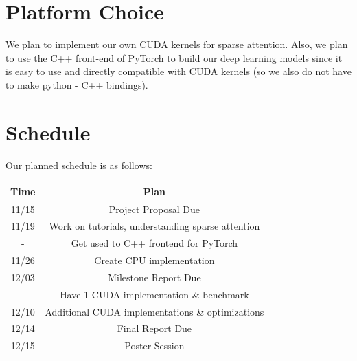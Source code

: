 \documentclass[11pt]{article}
\begin{document}


\section{Platform Choice}


We plan to implement our own CUDA kernels for sparse attention.
Also, we plan to use the C++ front-end of PyTorch to build our deep learning models since it is easy to use and directly compatible with CUDA kernels (so we also do not have to make python - C++ bindings).




\section{Schedule}
Our planned schedule is as follows:
\begin{center}
\begin{tabular}{ |c|c| } 
 \hline
 Time & Plan \\ 
 \hline
 11/15 & Project Proposal Due \\
 11/19 & Work on tutorials, understanding sparse attention\\
 - & Get used to C++ frontend for PyTorch \\
 11/26 & Create CPU implementation\\
 12/03 & Milestone Report Due \\ 
 - & Have 1 CUDA implementation \& benchmark\\
 12/10 & Additional CUDA implementations \& optimizations\\
 12/14 & Final Report Due \\ 
 12/15 & Poster Session \\
 \hline
\end{tabular}
\end{center}


\end{document}
